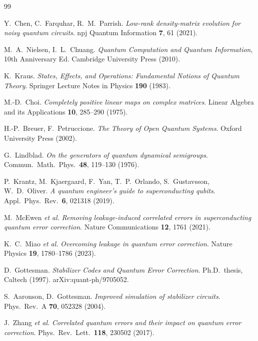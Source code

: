 \documentclass[11pt,a4paper]{article}
\begin{document}
\begin{thebibliography}{99}

  Y.~Chen, C.~Farquhar, R.~M.~Parrish.
  \textit{Low-rank density-matrix evolution for noisy quantum circuits}.
  npj Quantum Information \textbf{7}, 61 (2021).

  M.~A.~Nielsen, I.~L.~Chuang.
  \textit{Quantum Computation and Quantum Information}, 10th Anniversary Ed.
  Cambridge University Press (2010).

  K.~Kraus.
  \textit{States, Effects, and Operations: Fundamental Notions of Quantum Theory}.
  Springer Lecture Notes in Physics \textbf{190} (1983).

  M.-D.~Choi.
  \textit{Completely positive linear maps on complex matrices}.
  Linear Algebra and its Applications \textbf{10}, 285--290 (1975).

  H.-P.~Breuer, F.~Petruccione.
  \textit{The Theory of Open Quantum Systems}. Oxford University Press (2002).

  G.~Lindblad.
  \textit{On the generators of quantum dynamical semigroups}.
  Commun.\ Math.\ Phys.\ \textbf{48}, 119--130 (1976).

  P.~Krantz, M.~Kjaergaard, F.~Yan, T.~P.~Orlando, S.~Gustavsson, W.~D.~Oliver.
  \textit{A quantum engineer's guide to superconducting qubits}.
  Appl.\ Phys.\ Rev.\ \textbf{6}, 021318 (2019).

  M.~McEwen \textit{et al.}
  \textit{Removing leakage-induced correlated errors in superconducting quantum
  error correction}.
  Nature Communications \textbf{12}, 1761 (2021).

  K.~C.~Miao \textit{et al.}
  \textit{Overcoming leakage in quantum error correction}.
  Nature Physics \textbf{19}, 1780--1786 (2023).

  D.~Gottesman.
  \textit{Stabilizer Codes and Quantum Error Correction}.
  Ph.D.\ thesis, Caltech (1997). arXiv:quant-ph/9705052.

  S.~Aaronson, D.~Gottesman.
  \textit{Improved simulation of stabilizer circuits}.
  Phys.\ Rev.\ A \textbf{70}, 052328 (2004).

  J.~Zhang \textit{et al.}
  \textit{Correlated quantum errors and their impact on quantum error correction}.
  Phys.\ Rev.\ Lett.\ \textbf{118}, 230502 (2017).


\end{thebibliography}
\end{document}

